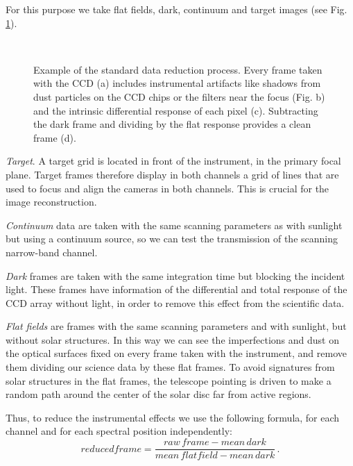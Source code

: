 For this purpose we take flat fields, dark, continuum and target images (see Fig. \ref {fig:obs:red2}).
\begin{figure}[t]
  \centering
  \quad%
    \\
  \quad%
  \quad%
    \caption{Example of the standard data reduction process. Every frame taken with the CCD   (a) includes instrumental artifacts like shadows from dust particles on the CCD chips or the filters near the focus (Fig. b) and the intrinsic differential response of each pixel (c). Subtracting the dark frame and dividing by the flat response provides a clean frame (d).}
\label{fig:obs:red2}

\end{figure}


\emph{Target}. A target grid is located in front of the instrument, in the primary focal plane. Target frames therefore display in both channels a grid of lines that are used to focus and align the cameras in both channels. This is crucial for the image reconstruction. 

\emph{Continuum} data are taken with the same scanning parameters as with sunlight but using a continuum source, so we can test the transmission of the scanning narrow-band channel. 

\emph{Dark} frames are taken with the same integration time but blocking the incident light. These frames have information of the differential and total response of the CCD array without light, in order to remove this effect from the scientific data. 

\emph{Flat fields}  are frames with the same scanning parameters and with sunlight, but without solar structures. In this way we can see the imperfections and dust on the optical surfaces fixed on every frame taken with the instrument, and remove them dividing our science data by these flat frames. To avoid signatures from solar structures in the flat frames, the telescope pointing is driven to make a random path around the center of the solar disc far from active regions.

Thus, to reduce the instrumental effects we use the following formula, for each channel and for each spectral position independently:
\begin{equation}
 reduced frame=\frac{raw\,frame  - mean\,dark}{mean\,flatfield - mean\,dark} \, .
\end{equation}


